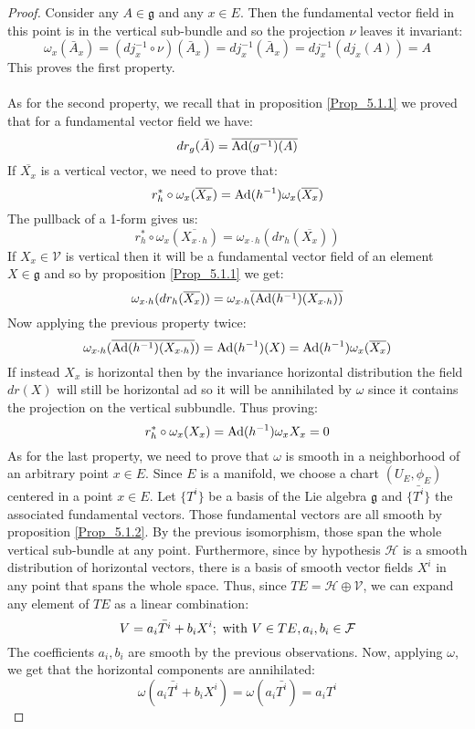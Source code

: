 \documentclass[12pt,a4paper]{report}
\theoremstyle{definition}
\theoremstyle{Theorem}
\theoremstyle{definition}
\theoremstyle{definition}
\begin{document}
	\begin{proof}
		Consider any $A\in\mathfrak{g}$ and any $x\in E$. Then the fundamental vector field in this point is in the vertical sub-bundle and so the projection $\nu$ leaves it invariant:
		$$\omega_{x}(\bar{A}_{x})=(dj_{x}^{-1}\circ \nu)(\bar{A}_{x})=dj_{x}^{-1}(\bar{A}_{x})=
		dj_{x}^{-1}(dj_{x}(A))=A$$
		This proves the first property.\\
		\\
		As for the second property, we recall that in proposition \ref{Prop_5.1.1} we proved that for a fundamental vector field  we have:
		$$dr_g(\bar{A})=\overline{\hbox{Ad}(g^{-1})(A)}$$
		If $\overline{X_x}$ is a vertical vector, we need to prove that:
		$$r^*_h\circ \omega_{x}(\overline{X_{x}})=\hbox{Ad}(h^{-1})\omega_{x}(\overline{X_{x}})$$
		The pullback of a 1-form gives us:
		$$r^*_h\circ \omega_{x}(\overline{X_{x\cdot h}})=\omega_{x\cdot h}(dr_h(\overline{X_{x}}))$$
		If $X_{x}\in\mathcal{V}$ is vertical then it will be a fundamental vector field of an element $X\in\mathfrak{g}$ and so by proposition \ref{Prop_5.1.1} we get:
		$$\omega_{x\cdot h}(dr_h(\overline{X_{x}}))=\omega_{x\cdot h}\overline{(\hbox{Ad}(h^{-1})(X_{x\cdot h}))}$$
		Now applying the previous property twice:
		$$\omega_{x\cdot h}(\overline{\hbox{Ad}(h^{-1})(X_{x\cdot h})})=\hbox{Ad}(h^{-1})(X)=\hbox{Ad}(h^{-1})\omega_{x}(\overline{X_{x}})$$
		If instead $X_{x}$ is horizontal then by the invariance horizontal distribution the field $dr(X)$ will still be horizontal ad so it will be annihilated by $\omega$ since it contains the projection on the vertical subbundle. Thus proving:
		$$r^*_h\circ \omega_{x}(X_{x})=\hbox{Ad}(h^{-1})\omega_{x}X_{x}=0$$
		As for the last property, we need to prove that $\omega$ is smooth in a neighborhood of an arbitrary point $x\in E$. Since $E$ is a manifold, we choose a chart $(U_E,\phi_E)$ centered in a point $x\in E$. Let $\{T^i\}$ be a basis of the Lie algebra $\mathfrak{g}$ and $\{\bar{T^i}\}$ the associated fundamental vectors. Those fundamental vectors are all smooth by proposition \ref{Prop_5.1.2}. By the previous isomorphism, those span the whole vertical sub-bundle at any point. Furthermore, since by hypothesis $\mathcal{H}$ is a smooth distribution of horizontal vectors, there is a basis of smooth vector fields $X^i$ in any point that spans the whole space. Thus, since $TE=\mathcal{H}\oplus\mathcal{V}$, we can expand any element of $TE$ as a linear combination:
		$$V=a_i \bar{T^i}+b_iX^i;\hbox{ with } V\in TE, a_i,b_i\in \mathcal{F}$$
		The coefficients $a_i,b_i$ are smooth by the previous observations. Now, applying $\omega$, we get that the horizontal components are annihilated:
		$$\omega(a_i \bar{T^i}+b_iX^i)=\omega(a_i \bar{T^i})=a_i T^i$$
	\end{proof}
\end{document}
